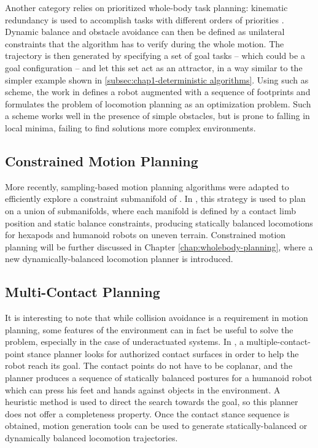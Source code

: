 Another category relies on prioritized whole-body task planning:
kinematic redundancy is used to accomplish tasks with different orders
of priorities \cite{khatib2004wbd, saab-tro-12}. Dynamic balance and
obstacle avoidance can then be defined as unilateral constraints that
the algorithm has to verify during the whole motion. The trajectory is
then generated by specifying a set of goal tasks -- which could be a
goal configuration -- and let this set act as an attractor, in a way
similar to the simpler example shown in
\ref{subsec:chap1-deterministic algorithms}. Using such as scheme, the
work in \cite{kano09} defines a robot augmented with a sequence of
footprints and formulates the problem of locomotion planning as an
optimization problem. Such a scheme works well in the presence of
simple obstacles, but is prone to falling in local minima, failing to
find solutions more complex environments.

\subsection{Constrained Motion Planning}
\label{subsec:chap1-constrained-motion-planning}

More recently, sampling-based motion planning algorithms were adapted
to efficiently explore a constraint submanifold of {\cspace}. In
\cite{bretl2006motion, haus10}, this strategy is used to plan on a
union of submanifolds, where each manifold is defined by a contact
limb position and static balance constraints, producing statically
balanced locomotions for hexapods and humanoid robots on uneven
terrain. Constrained motion planning will be further discussed in
Chapter \ref{chap:wholebody-planning}, where a new
dynamically-balanced locomotion planner is introduced.

\subsection{Multi-Contact Planning}
\label{subsec-chap1-multi-contact-planning}

It is interesting to note that while collision avoidance is a
requirement in motion planning, some features of the environment can
in fact be useful to solve the problem, especially in the case of
underactuated systems. In \cite{bouy12, escande2013planning}, a
multiple-contact-point stance planner looks for authorized contact
surfaces in order to help the robot reach its goal. The contact points
do not have to be coplanar, and the planner produces a sequence of
statically balanced postures for a humanoid robot which can press his
feet and hands against objects in the environment. A heuristic method
is used to direct the search towards the goal, so this planner does
not offer a completeness property. Once the contact stance sequence is
obtained, motion generation tools can be used to generate
statically-balanced or dynamically balanced locomotion trajectories.

